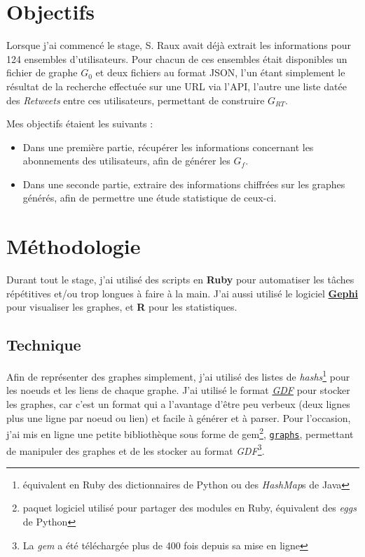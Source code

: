 \documentclass[]{article}
\begin{document}
\section{Objectifs}

Lorsque j'ai commencé le stage, S. Raux avait déjà extrait les
informations pour 124 ensembles d'utilisateurs. Pour chacun de ces
ensembles était disponibles un fichier de graphe $G_{0}$ et deux fichiers
au format JSON, l'un étant simplement le résultat de la recherche
effectuée sur une URL via l'API, l'autre une liste datée des
\emph{Retweets} entre ces utilisateurs, permettant de construire $G_{RT}$.

Mes objectifs étaient les suivants :

\begin{itemize}
\item
 Dans une première partie, récupérer les informations concernant les
 abonnements des utilisateurs, afin de générer les $G_{f}$.
\item
 Dans une seconde partie, extraire des informations chiffrées sur les
 graphes générés, afin de permettre une étude statistique de ceux-ci.
\end{itemize}
\section{Méthodologie}

Durant tout le stage, j'ai utilisé des scripts en \textbf{Ruby} pour
automatiser les tâches répétitives et/ou trop longues à faire à la main.
J'ai aussi utilisé le logiciel \href{https://gephi.org}{\textbf{Gephi}}
pour visualiser les graphes, et \textbf{R} pour les statistiques.

\subsection{Technique}

Afin de représenter des graphes simplement, j'ai utilisé des listes de
\emph{hashs}\footnote{équivalent en Ruby des dictionnaires de Python ou
 des \emph{HashMap}s de Java} pour les noeuds et les liens de chaque
graphe. J'ai utilisé le format
\href{http://guess.wikispot.org/The\_GUESS\_.gdf\_format}{\emph{GDF}}
pour stocker les graphes, car c'est un format qui a l'avantage d'être
peu verbeux (deux lignes plus une ligne par noeud ou lien) et facile à 
générer et à parser. Pour l'occasion, j'ai mis en ligne une petite
bibliothèque sous forme de gem\footnote{paquet logiciel utilisé pour
 partager des modules en Ruby, équivalent des \emph{eggs} de Python},
\href{https://rubygems.org/gems/graphs}{\texttt{graphs}}, permettant de
manipuler des graphes et de les stocker au format \emph{GDF}\footnote{La
\emph{gem} a été téléchargée plus de 400 fois depuis sa mise en ligne}.
\end{document}
